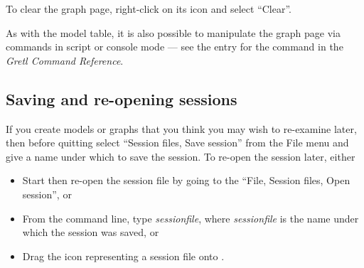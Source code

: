 To clear the graph page, right-click on its icon and select ``Clear''.

As with the model table, it is also possible to manipulate the graph
page via commands in script or console mode --- see the entry for the
 command in the \emph{Gretl Command Reference}.


\subsection{Saving and re-opening sessions}
\label{session-save}

If you create models or graphs that you think you may wish to
re-examine later, then before quitting  select ``Session
files, Save session'' from the File menu and give a name under
which to save the session.  To re-open the session later, either

\begin{itemize}
\item Start  then re-open the session file by going to the
  ``File, Session files, Open session'', or
\item From the command line, type  \textsl{sessionfile},
  where \textsl{sessionfile} is the name under which the session was
  saved, or
\item Drag the icon representing a  session file onto
  .
\end{itemize}




